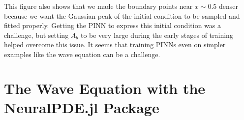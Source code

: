 \documentclass[11pt]{article}
\newcommand{\1}{\mathbf 1}
\begin{document}
This figure also shows that we made the boundary points near $x \sim 0.5$ denser because we want the Gaussian peak of the initial condition to be sampled and fitted properly.
Getting the PINN to express this initial condition was a challenge, but setting $A_b$ to be very large during the early stages of training helped overcome this issue.
It seems that training PINNs even on simpler examples like the wave equation can be a challenge.



\section{The Wave Equation with the NeuralPDE.jl Package}
\end{document}
